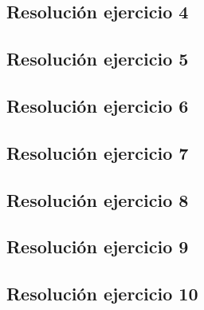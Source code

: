 \documentclass[11pt,a4paper]{article}
\begin{document}
	\newpage

	\subsection{Resolución ejercicio 4}\label{ejercicio_4}
		

	\newpage

	\subsection{Resolución ejercicio 5}\label{ejercicio_5}
		

	\newpage

	\subsection{Resolución ejercicio 6}\label{ejercicio_6}
		

	\newpage

	\subsection{Resolución ejercicio 7}\label{ejercicio_7}
		

	\newpage

	\subsection{Resolución ejercicio 8}\label{ejercicio_8}
		

	\newpage

	\subsection{Resolución ejercicio 9}\label{ejercicio_9}
		

	\newpage

	\subsection{Resolución ejercicio 10}\label{ejercicio_10}
		
\end{document}
